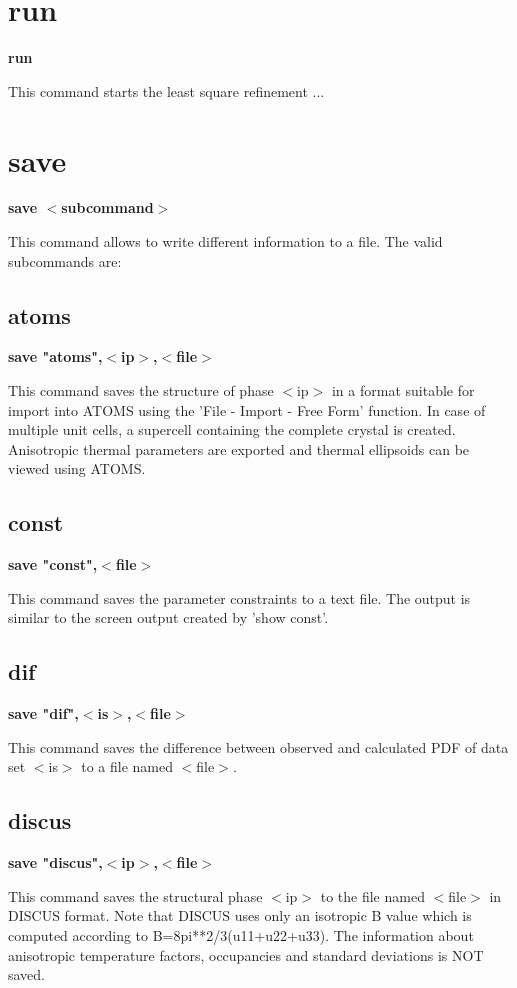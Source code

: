 \section{run}
{\bf run \par }
\par
\vspace{3pt}
This command starts the least square refinement ... 
\section{save}
{\bf save $ <$subcommand$> $ \par }
\par
\vspace{3pt}
This command allows to write different information to a file. 
The valid subcommands are: 
\par
\subsection*{atoms}
{\bf save "atoms",$ <$ip$> $,$ <$file$> $ \par }
\par
\vspace{3pt}
This command saves the structure of phase $ <$ip$> $ in a format suitable 
for import into ATOMS using the 'File - Import - Free Form' function. 
In case of multiple unit cells, a supercell containing the complete 
crystal is created. Anisotropic thermal parameters are exported and 
thermal ellipsoids can be viewed using ATOMS. 
\subsection*{const}
{\bf save "const",$ <$file$> $ \par }
\par
\vspace{3pt}
This command saves the parameter constraints to a text file. 
The output is similar to the screen output created by 'show const'. 
\subsection*{dif}
{\bf save "dif",$ <$is$> $,$ <$file$> $ \par }
\par
\vspace{3pt}
This command saves the difference between observed and calculated 
PDF of data set $ <$is$> $ to a file named $ <$file$> $. 
\subsection*{discus}
{\bf save "discus",$ <$ip$> $,$ <$file$> $ \par }
\par
\vspace{3pt}
This command saves the structural phase $ <$ip$> $ to the file named 
$ <$file$> $ in DISCUS format. Note that DISCUS uses only an isotropic 
B value which is computed according to B=8pi**2/3(u11+u22+u33). 
The information about anisotropic temperature factors, occupancies 
and standard deviations is NOT saved. 
